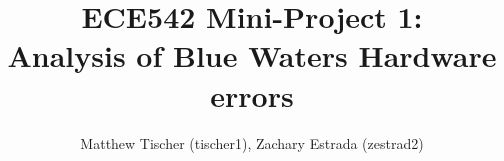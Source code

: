 \documentclass[notitlepage,groupedaddress]{IEEEtran}
\begin{document}
\title{ECE542 Mini-Project 1:\\ Analysis of Blue Waters Hardware errors}
\author{Matthew Tischer (tischer1), Zachary Estrada (zestrad2)}

\maketitle
\begin{abstract}
\end{abstract}











\end{document}
